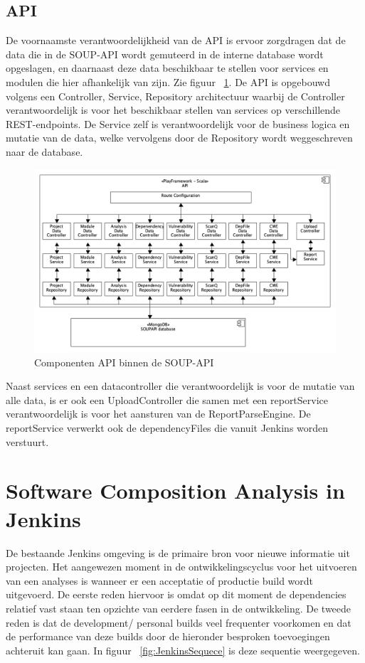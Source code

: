 \newpage %
\subsection{API}\label{subsec:api2}
De voornaamste verantwoordelijkheid van de API is ervoor zorgdragen dat de data die in de SOUP-API wordt gemuteerd in de interne database wordt opgeslagen, en daarnaast deze data beschikbaar te stellen voor services en modulen die hier afhankelijk van zijn. Zie figuur ~\ref{fig:SOUPAPI-API comps}. De API is opgebouwd volgens een Controller, Service, Repository architectuur waarbij de Controller verantwoordelijk is voor het beschikbaar stellen van services op verschillende REST-endpoints. De Service zelf is verantwoordelijk voor de business logica en mutatie van de data, welke vervolgens door de Repository wordt weggeschreven naar de database.
\begin{figure}[bth]
    \myfloatalign
    \includegraphics[width=15cm]{gfx/umlet/exports/API-ComponentsDiagram}
    \caption{Componenten API binnen de SOUP-API}
    \label{fig:SOUPAPI-API comps}
\end{figure}

Naast services en een datacontroller die verantwoordelijk is voor de mutatie van alle data, is er ook een UploadController die samen met een reportService verantwoordelijk is voor het aansturen van de ReportParseEngine. De reportService verwerkt ook de dependencyFiles die vanuit Jenkins worden verstuurt.

\section{Software Composition Analysis in Jenkins}\label{sec:jenkins}
De bestaande Jenkins omgeving is de primaire bron voor nieuwe informatie uit projecten. Het aangewezen moment in de ontwikkelingscyclus voor het uitvoeren van een analyses is wanneer er een acceptatie of productie build wordt uitgevoerd. De eerste reden hiervoor is omdat op dit moment de dependencies relatief vast staan ten opzichte van eerdere fasen in de ontwikkeling. De tweede reden is dat de development/ personal builds veel frequenter voorkomen en dat de performance van deze builds door de hieronder besproken toevoegingen achteruit kan gaan. In figuur ~\ref{fig:JenkinsSequece} is deze sequentie weergegeven.


